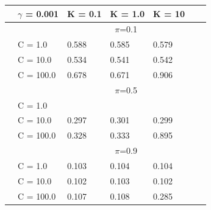 \documentclass[english]{report}
\begin{document}
\begin{table}[H]
    \centering
    
    \begin{tabular}{ll|lllll}
        \hline
                                & \textbf{$\gamma$ = 0.001} &         K = 0.1 & K = 1.0 & K = 10 \\ \hline
                                & & \multicolumn{3}{c}{$\pi$=0.1} \\ \hline
                                & C = 1.0    & 0.588 & 0.585 & 0.579    \\
                                & C = 10.0   & 0.534 & 0.541 & 0.542  \\
                                & C = 100.0   & 0.678 & 0.671 & 0.906  \\ \hline

                                & & \multicolumn{3}{c}{$\pi$=0.5} \\ \hline
                                & C = 1.0    & \color{red}{0.295} & \color{red}{0.294} & \color{red}{0.298}    \\
                                & C = 10.0   & 0.297 & 0.301 & 0.299  \\
                                & C = 100.0   & 0.328 & 0.333 & 0.895  \\ \hline

                                & & \multicolumn{3}{c}{$\pi$=0.9} \\ \hline
                                & C = 1.0    & 0.103 & 0.104 & 0.104    \\
                                & C = 10.0   & 0.102 & 0.103 & 0.102  \\
                                & C = 100.0   & 0.107 & 0.108 & 0.285  \\ 
    \hline
    \end{tabular}
\end{table}
\end{document}

